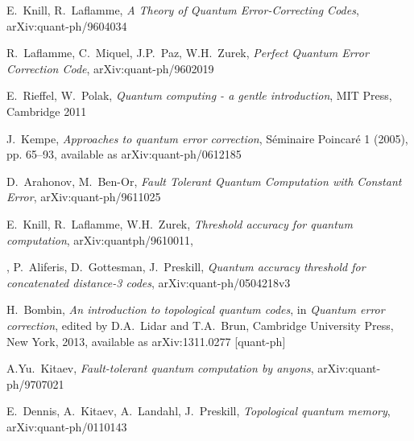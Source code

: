 \documentclass[a4paper, draft]{article}
\theoremstyle{own}
\theoremstyle{remark}
\begin{document}
\begin{thebibliography}{9}
E.~Knill, R.~Laflamme, \emph{A Theory of Quantum Error-Correcting Codes}, arXiv:quant-ph/9604034

R.~Laflamme, C.~Miquel, J.P.~Paz, W.H.~Zurek, \emph{Perfect Quantum Error Correction Code}, 	arXiv:quant-ph/9602019	
	

E.~Rieffel, W.~Polak, \emph{Quantum computing - a gentle introduction},
MIT Press, Cambridge 2011

J.~Kempe, \emph{Approaches to quantum error correction}, S\'eminaire Poincar\'e 1 (2005), pp. 65--93, available as arXiv:quant-ph/0612185

D.~Arahonov, M.~Ben-Or, \emph{Fault Tolerant Quantum Computation with Constant Error},
arXiv:quant-ph/9611025

E.~Knill, R.~Laflamme, W.H.~Zurek, \emph{Threshold accuracy for quantum computation}, arXiv:quantph/9610011,

,
P.~Aliferis, D.~Gottesman, J.~Preskill, \emph{Quantum accuracy threshold for concatenated distance-3 codes}, arXiv:quant-ph/0504218v3

H.~Bombin, 
\emph{An introduction to topological quantum codes}, in \emph{Quantum error correction}, edited by D.A.~Lidar and T.A.~Brun, Cambridge University Press, New York, 2013, available as arXiv:1311.0277 [quant-ph]

A.Yu.~Kitaev, \emph{Fault-tolerant quantum computation by anyons}, 
arXiv:quant-ph/9707021

E.~Dennis, A.~Kitaev, A.~Landahl, J.~Preskill,
\emph{Topological quantum memory}, arXiv:quant-ph/0110143

\end{thebibliography}
\end{document}
